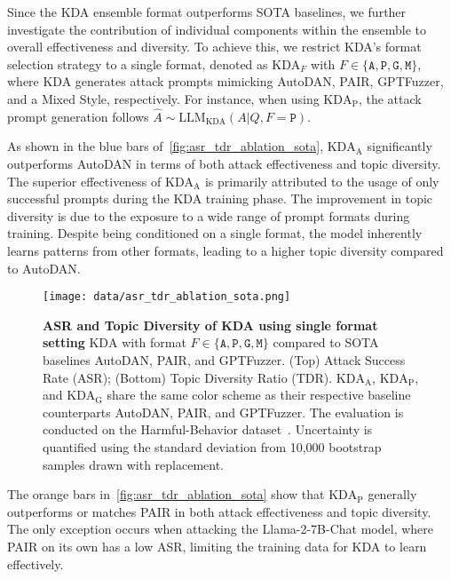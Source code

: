Since the KDA ensemble format outperforms SOTA baselines, we further investigate the contribution of individual components within the ensemble to overall effectiveness and diversity. To achieve this, we restrict KDA's format selection strategy to a single format, denoted as $\text{KDA}_{F}$ with $F \in \{\texttt{A}, \texttt{P},\texttt{G}, \texttt{M}\}$, where KDA generates attack prompts mimicking AutoDAN, PAIR, GPTFuzzer, and a Mixed Style, respectively. For instance, when using $\text{KDA}_{\text{P}}$, the attack prompt generation follows $\hat{A}\sim \text{LLM}_{\text{KDA}}(A|Q, F=\texttt{P})$. 

 As shown in the blue bars of~\autoref{fig:asr_tdr_ablation_sota}, $\text{KDA}_{\text{A}}$ significantly outperforms AutoDAN in terms of both attack effectiveness and topic diversity. The superior effectiveness of $\text{KDA}_{\text{A}}$ is primarily attributed to the usage of only successful prompts during the KDA training phase. The improvement in topic diversity is due to the exposure to a wide range of prompt formats during training. Despite being conditioned on a single format, the model inherently learns patterns from other formats, leading to a higher topic diversity compared to AutoDAN.

\begin{figure}[h]
\centering
    \texttt{[image: data/asr\_tdr\_ablation\_sota.png]}
    \vspace{-2mm}
    \caption{\textbf{ASR and Topic Diversity of KDA using single format setting} $\text{KDA}$ with format $F \in \{\texttt{A}, \texttt{P},\texttt{G}, \texttt{M}\}$ compared to SOTA baselines AutoDAN, PAIR, and GPTFuzzer. (Top) Attack Success Rate (ASR); (Bottom) Topic Diversity Ratio (TDR). $\text{KDA}_\text{A}$, $\text{KDA}_\text{P}$, and $\text{KDA}_\text{G}$ share the same color scheme as their respective baseline counterparts AutoDAN, PAIR, and GPTFuzzer. The evaluation is conducted on the Harmful-Behavior dataset~\citep{chao_jailbreaking_2024}. Uncertainty is quantified using the standard deviation from 10,000 bootstrap samples drawn with replacement.
    }\label{fig:asr_tdr_ablation_sota}
   \vspace{-0mm}
\end{figure}

 The orange bars in~\autoref{fig:asr_tdr_ablation_sota} show that $\text{KDA}_{\text{P}}$ generally outperforms or matches PAIR in both attack effectiveness and topic diversity. The only exception occurs when attacking the Llama-2-7B-Chat model, where PAIR on its own has a low ASR, limiting the training data for KDA to learn effectively.

